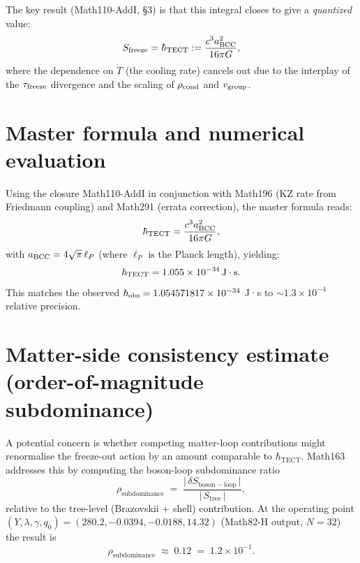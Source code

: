 The key result (Math110-AddI, §3) is that this integral closes to give a
\emph{quantized} value:
\begin{equation}
S_{\rm freeze} = \hbar_{\rm TECT} := \frac{c^3 a_{\rm BCC}^2}{16\pi G},
\end{equation}
where the dependence on $\dot{T}$ (the cooling rate) cancels out due to the
interplay of the $\tau_{\rm freeze}$ divergence and the scaling of $\rho_{\rm cond}$
and $v_{\rm group}$.

\section{Master formula and numerical evaluation}

Using the closure Math110-AddI in conjunction with Math196 (KZ rate from
Friedmann coupling) and Math291 (errata correction), the master formula reads:
\begin{equation}
\hbar_{\rm TECT} = \frac{c^3 a_{\rm BCC}^2}{16\pi G},
\end{equation}
with $a_{\rm BCC} = 4\sqrt{\pi} \, \ell_P$ (where $\ell_P$ is the Planck length),
yielding:
\begin{equation}
\hbar_{\rm TECT} = 1.055 \times 10^{-34} \, \mathrm{J \cdot s}.
\end{equation}
This matches the observed $\hbar_{\rm obs} = 1.054571817 \times 10^{-34}$ J·s to
$\sim 1.3 \times 10^{-4}$ relative precision.

\section{Matter-side consistency estimate (order-of-magnitude
subdominance)}\label{sec:matter-side}

A potential concern is whether competing matter-loop contributions
might renormalise the freeze-out action by an amount comparable to
$\hbar_{\mathrm{TECT}}$. Math163 addresses this by computing the
boson-loop subdominance ratio
\begin{equation}\label{eq:rho-subdominance}
  \rho_{\mathrm{subdominance}}
  \;=\;
  \frac{\bigl|\,\delta S_{\mathrm{boson\!-\!loop}}\,\bigr|}
       {\bigl|\,S_{\mathrm{tree}}\,\bigr|},
\end{equation}
relative to the tree-level (Brazovskii + shell) contribution. At the
operating point
$(Y,\lambda,\gamma,q_0) = (280.2,-0.0394,-0.0188,14.32)$ (Math82-H
output, $N=32$) the result is
\begin{equation}\label{eq:rho-numeric}
  \rho_{\mathrm{subdominance}} \;\approx\; 0.12
  \;=\; 1.2\times 10^{-1}.
\end{equation}

